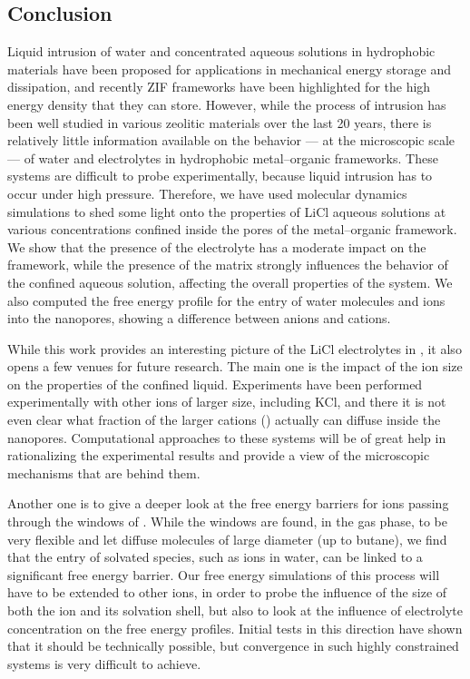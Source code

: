 \documentclass[thesis]{subfiles}
\begin{document}
\newpage
\subsection*{Conclusion}

Liquid intrusion of water and concentrated aqueous solutions in hydrophobic
materials have been proposed for applications in mechanical energy storage and
dissipation, and recently ZIF frameworks have been highlighted for the high
energy density that they can store. However, while the process of intrusion has
been well studied in various zeolitic materials over the last 20 years, there is
relatively little information available on the behavior --- at the microscopic
scale --- of water and electrolytes in hydrophobic metal--organic frameworks.
These systems are difficult to probe experimentally, because liquid intrusion
has to occur under high pressure. Therefore, we have used molecular dynamics
simulations to shed some light onto the properties of LiCl aqueous solutions at
various concentrations confined inside the pores of the  metal--organic
framework. We show that the presence of the electrolyte has a moderate impact on
the  framework, while the presence of the  matrix strongly influences
the behavior of the confined aqueous solution, affecting the overall properties
of the system. We also computed the free energy profile for the entry of water
molecules and ions into the nanopores, showing a difference between anions and
cations.

While this work provides an interesting picture of the LiCl electrolytes in
, it also opens a few venues for future research. The main one is the
impact of the ion size on the properties of the confined liquid. Experiments
have been performed experimentally with other ions of larger size, including
KCl, and there it is not even clear what fraction of the larger cations
() actually can diffuse inside the nanopores. Computational approaches to
these systems will be of great help in rationalizing the experimental results
and provide a view of the microscopic mechanisms that are behind them.

Another one is to give a deeper look at the free energy barriers for ions
passing through the windows of . While the windows are found, in the gas
phase, to be very flexible and let diffuse molecules of large diameter (up to
butane), we find that the entry of solvated species, such as ions in water, can
be linked to a significant free energy barrier. Our free energy simulations of
this process will have to be extended to other ions, in order to probe the
influence of the size of both the ion and its solvation shell, but also to look
at the influence of electrolyte concentration on the free energy profiles.
Initial tests in this direction have shown that it should be technically
possible, but convergence in such highly constrained systems is very difficult
to achieve.
\end{document}
